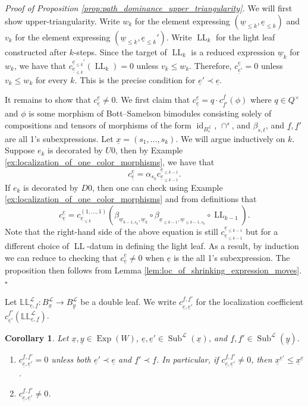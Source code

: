 \documentclass{amsart}
\newcommand{\scrL}{\mathcal{L}}
\DeclareMathOperator{\id}{id}
\DeclareMathOperator{\LL}{LL}
\newcommand{\dLL}{\mathbb{L}\mathbb{L}}
\DeclareMathOperator{\Exp}{Exp}
\DeclareMathOperator{\Subexp}{Sub}
\newcommand{\ue}{\underline{e}}
\newcommand{\uf}{\underline{f}}
\newcommand{\uw}{\underline{w}}
\newcommand{\ux}{\underline{x}}
\newcommand{\uy}{\underline{y}}
\newtheorem{corollary}[subsubsection]{Corollary}
\theoremstyle{definition}
\newenvironment{midsecproof}[1]{\vspace{\topsep} \noindent \textit{Proof of #1.}}{\hfill $\square$}
\numberwithin{equation}{subsection}
\begin{document}
\begin{midsecproof}{Proposition \ref{prop:path_dominance_upper_triangularity}}
    We will first show upper-triangularity.
    Write $w_k$ for the element expressing $(\uw_{\leq k}, \ue_{\leq k})$ and $v_k$ for the element expressing $(\uw_{\leq k}, \ue_{\leq k}')$.
    Write $\LL_k$ for the light leaf constructed after $k$-steps.
    Since the target of $\LL_k$ is a reduced expression $\uw_k$ for $w_k$, we have that $c_{\ue_{\leq k}}^{\ue_{\leq k}'} (\LL_k) = 0$ unless $v_k \leq w_k$.
    Therefore, $c_{\ue'}^{\ue} = 0$ unless $v_k \leq w_k$ for every $k$. This is the precise condition for $\ue' \prec \ue$.

    It remains to show that $c_{\ue}^{\ue} \neq 0$. We first claim that $c_{\ue}^{\ue} = q \cdot c_{\uf'}^{\uf} (\phi)$ where $q \in Q^{\times}$ and $\phi$ is some morphism of Bott--Samelson bimodules consisting solely of compositions and tensors of morphisms of the form $\id_{B_s^{\scrL}}$, $\cap^s$, and $\beta_{s,t}$, and $\uf, \uf'$ are all 1's subexpressions.
    Let $\ux = (s_1, \ldots, s_k)$. We will argue inductively on $k$.
    Suppose $e_k$ is decorated by $U0$, then by Example \ref{ex:localization_of_one_color_morphisms}, we have that
    \[c_{\ue}^{\ue} = \alpha_{s_k} c_{\ue_{\leq k -1}}^{\ue_{\leq k-1}}.\]
    If $e_k$ is decorated by $D0$, then one can check using Example \ref{ex:localization_of_one_color_morphisms} and from definitions that
     \[c_{\ue}^{\ue} = c_{\ue_{\leq k}}^{(1, \ldots, 1)} \left( \beta_{\uw_{k-1, s_k}, \uw_k} \circ \beta_{\ux_{\leq k-1}, \uw_{\leq k-1, s_k}} \circ \LL_{k-1}\right).\]
    Note that the right-hand side of the above equation is still $c_{\ue_{\leq k -1}}^{\ue_{\leq k-1}}$ but for a different choice of $\LL$-datum in defining the light leaf.
    As a result, by induction we can reduce to checking that $c_{\ue}^{\ue} \neq 0$ when $\ue$ is the all 1's subexpression.
    The proposition then follows from Lemma \ref{lem:loc_of_shrinking_expression_moves}.
\end{midsecproof}

Let $\dLL_{\ue, \uf}^{\scrL} : B_{\ux}^{\scrL} \to B_{\uy}^{\scrL}$ be a double leaf. We write $c_{\ue, \ue'}^{\uf, \uf'}$ for the localization coefficient $c_{\ue'}^{\uf'} (\dLL_{\ue, \uf}^{\scrL})$.

\begin{corollary}\label{cor:Bruhat_upper_triangularity}
    Let $\ux, \uy \in \Exp (W)$, $\ue, \ue' \in \Subexp^{\scrL} (\ux)$, and $\uf, \uf' \in \Subexp^{\scrL} (\uy)$.
    \begin{enumerate}
        \item $c_{\ue, \ue'}^{\uf, \uf'}= 0$ unless both $\ue' \prec \ue$ and $\uf' \prec \uf$. In particular, if $c_{\ue, \ue'}^{\uf, \uf'} \neq 0$, then $\ux^{\ue'} \leq \ux^{\ue}$. 
        \item $c_{\ue, \ue'}^{\uf, \uf'} \neq 0$. 
    \end{enumerate}
\end{corollary}
\end{document}
